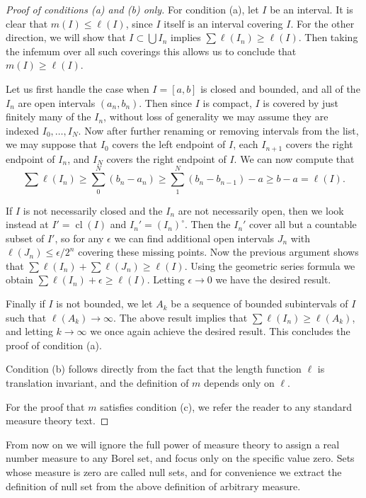 \documentclass[11pt,oneside]{amsbook}
\DeclareMathOperator{\cl}{cl}
\theoremstyle{definition}
\theoremstyle{plain}
\theoremstyle{definition}
\theoremstyle{remark}
\numberwithin{equation}{section}
\numberwithin{figure}{section}
\begin{document}
\begin{proof}[Proof of conditions (a) and (b) only]
  For condition (a), let $I$ be an interval. It is clear that $m(I)\leq\ell(I)$, since $I$ itself is an interval covering $I$. For the other direction, we will show that $I\subset\bigcup I_n$ implies $\sum\ell(I_n)\geq\ell(I)$. Then taking the infemum over all such coverings this allows us to conclude that $m(I)\geq\ell(I)$.

  Let us first handle the case when $I=[a,b]$ is closed and bounded, and all of the $I_n$ are open intervals $(a_n,b_n)$. Then since $I$ is compact, $I$ is covered by just finitely many of the $I_n$, without loss of generality we may assume they are indexed $I_0,\ldots,I_N$. Now after further renaming or removing intervals from the list, we may suppose that $I_0$ covers the left endpoint of $I$, each $I_{n+1}$ covers the right endpoint of $I_n$, and $I_N$ covers the right endpoint of $I$. We can now compute that
\[\sum\ell(I_n)
\geq\sum_0^N(b_n-a_n)
\geq\sum_1^N(b_n-b_{n-1})-a
\geq b-a
= \ell(I)\text{.}
\]

  If $I$ is not necessarily closed and the $I_n$ are not necessarily open, then we look instead at $I'=\cl(I)$ and $I_n'=(I_n)^\circ$. Then the $I_n'$ cover all but a countable subset of $I'$, so for any $\epsilon$ we can find additional open intervals $J_n$ with $\ell(J_n)\leq\epsilon/2^n$ covering these missing points. Now the previous argument shows that $\sum\ell(I_n)+\sum\ell(J_n)\geq\ell(I)$. Using the geometric series formula we obtain $\sum\ell(I_n)+\epsilon\geq\ell(I)$. Letting $\epsilon\to0$ we have the desired result.

  Finally if $I$ is not bounded, we let $A_k$ be a sequence of bounded subintervals of $I$ such that $\ell(A_k)\to\infty$. The above result implies that $\sum\ell(I_n)\geq\ell(A_k)$, and letting $k\to\infty$ we once again achieve the desired result. This concludes the proof of condition (a).

  Condition (b) follows directly from the fact that the length function $\ell$ is translation invariant, and the definition of $m$ depends only on $\ell$.

  For the proof that $m$ satisfies condition (c), we refer the reader to any standard measure theory text.
\end{proof}

From now on we will ignore the full power of measure theory to assign a real number measure to any Borel set, and focus only on the specific value zero. Sets whose measure is zero are called null sets, and for convenience we extract the definition of null set from the above definition of arbitrary measure.
\end{document}

